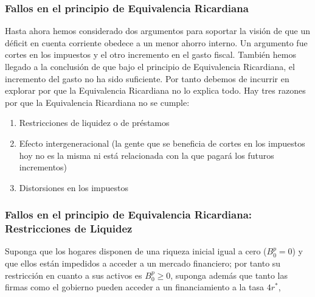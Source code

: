 \documentclass[10pt, xcolor=table, x11names]{beamer}
\begin{document}
\begin{frame}[label=16]
	\frametitle{{\normalsize Fallos en el principio de Equivalencia Ricardiana} {}}
	Hasta ahora hemos considerado dos argumentos para soportar la visión de que un déficit en cuenta corriente obedece a un menor ahorro interno. Un argumento fue cortes en los impuestos y el otro incremento en el gasto fiscal. 
	También hemos llegado a la conclusión de que bajo el principio de Equivalencia Ricardiana, el incremento del gasto no ha sido suficiente. Por tanto debemos de incurrir en explorar por que la Equivalencia Ricardiana no lo explica todo.
	Hay tres razones por que la Equivalencia Ricardiana no se cumple:
	 \begin{enumerate}
	 	\item Restricciones de liquidez o de préstamos
	 	\item Efecto intergeneracional (la gente que se beneficia de cortes en los impuestos hoy no es la misma ni está relacionada con la que pagará los futuros incrementos)
	 	\item Distorsiones en los impuestos
	 \end{enumerate}
\end{frame}

\begin{frame}[label=17]
	\frametitle{{\normalsize Fallos en el principio de Equivalencia Ricardiana: Restricciones de Liquidez} {}}
	Suponga que los hogares disponen de una riqueza inicial igual a cero ($B_{0}^{p}=0 $) y que ellos están impedidos a acceder a un mercado financiero; por tanto su restricción en cuanto a sus activos es $B_{0}^{p} \geq 0$, suponga además que tanto las firmas como el gobierno pueden acceder a un financiamiento a la tasa $4r^{*} $, 
\end{frame}
\end{document}
